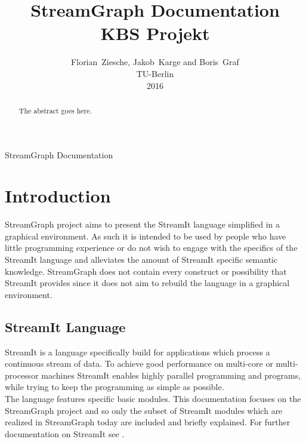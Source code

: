 \documentclass[journal]{IEEEtran}
\begin{document}
\title{StreamGraph Documentation\\KBS Projekt}
\author{Florian~Ziesche, Jakob~Karge and Boris~Graf\\TU-Berlin\\2016}

%
{StreamGraph Documentation}


\maketitle

\begin{abstract}
The abstract goes here.
\end{abstract}


\section{Introduction}
 StreamGraph project aims to present the StreamIt language
simplified in a graphical environment. As such it is intended to be used by
people who have little programming experience or do not wish to engage with the
specifics of the StreamIt language and alleviates the amount of StreamIt
specific semantic knowledge. StreamGraph does not contain every construct
or possibility that StreamIt provides since it does not aim to rebuild the
language in a graphical environment.



\subsection{StreamIt Language}
\noindent StreamIt is a language specifically build for applications which
process a continuous stream of data. To achieve good performance on multi-core
or multi-processor machines StreamIt enables highly parallel programming and
programs, while trying to keep the programming as simple as possible.\\

The language features specific basic modules. This documentation focuses on the
StreamGraph project and so only the subset of StreamIt modules which are
realized in StreamGraph today are included and briefly explained. For further
documentation on StreamIt see \cite{streamIt}.\\
\end{document}

